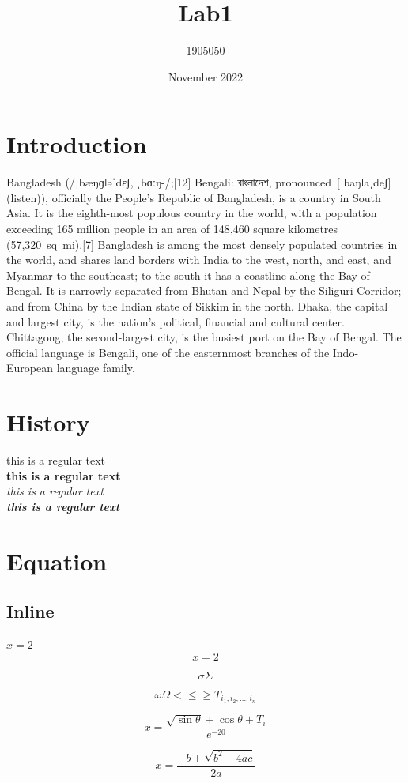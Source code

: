 \documentclass{article}
\title{Lab1}
\author{1905050 }
\date{November 2022}
\begin{document}
\newpage

\section{Introduction}
Bangladesh (/ˌbæŋɡləˈdɛʃ, ˌbɑːŋ-/;[12] Bengali: বাংলাদেশ, pronounced [ˈbaŋlaˌdeʃ] (listen)), officially the People's Republic of Bangladesh, is a country in South Asia. It is the eighth-most populous country in the world, with a population exceeding 165 million people in an area of 148,460 square kilometres (57,320 sq mi).[7] Bangladesh is among the most densely populated countries in the world, and shares land borders with India to the west, north, and east, and Myanmar to the southeast; to the south it has a coastline along the Bay of Bengal. It is narrowly separated from Bhutan and Nepal by the Siliguri Corridor; and from China by the Indian state of Sikkim in the north. Dhaka, the capital and largest city, is the nation's political, financial and cultural center. Chittagong, the second-largest city, is the busiest port on the Bay of Bengal. The official language is Bengali, one of the easternmost branches of the Indo-European language family. 
\section{History}
this is a regular text\\
\textbf{this is a regular text}\\
\textit{this is a regular text}\\
\textbf{\textit{this is a regular text}}\\

\section{Equation}
\subsection{Inline}

$x= 2 $
\[ x=2 \]

\[
\sigma
\Sigma
\]

\[
\omega
\Omega
<
\leq
\geq
T_{i_1,i_2,\dots,i_n}
\]

\begin{equation}
    x = \frac{\sqrt{\sin{\theta}}+{\cos{\theta}}+T_i}{e^{-20}}
\end{equation}

\begin{equation}
    x = \frac{-b\pm\sqrt{b^{2}-4ac}}{2a}
\end{equation}
\end{document}
